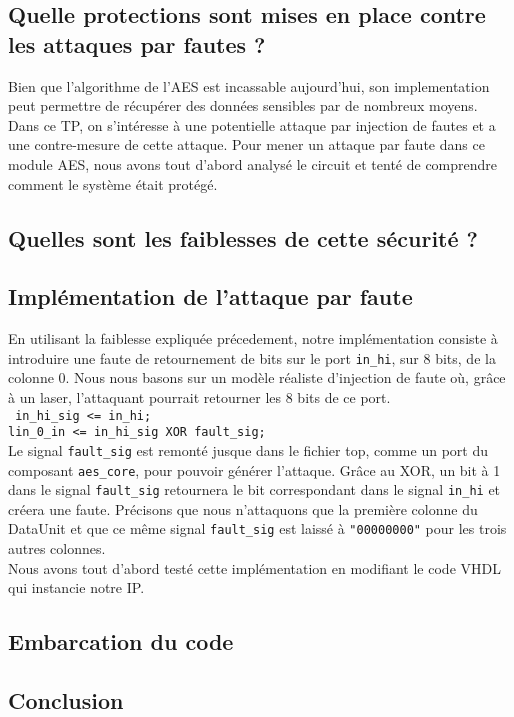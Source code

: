 \subsection{Quelle protections sont mises en place contre les attaques par fautes ?}

Bien que l'algorithme de l'AES est incassable aujourd'hui, son implementation peut permettre de récupérer des données sensibles par de nombreux moyens.
Dans ce TP, on s'intéresse à une potentielle attaque par injection de fautes et a une contre-mesure de cette attaque. 
Pour mener un attaque par faute  dans ce module AES, nous avons tout d'abord analysé le circuit et tenté de comprendre comment le système était protégé.

\subsection{Quelles sont les faiblesses de cette sécurité ?}

\subsection{Implémentation de l'attaque par faute}

En utilisant la faiblesse expliquée précedement, notre implémentation
consiste à introduire une faute de retournement de bits sur le port
\texttt{in_hi}, sur 8 bits, de la colonne 0. Nous nous basons sur un
modèle réaliste d'injection de faute où, grâce à un laser, l'attaquant
pourrait retourner les 8 bits de ce port.\\
\texttt{
  in_hi_sig <= in_hi; \\
  lin_0_in <= in_hi_sig XOR fault_sig;
} \\
Le signal \texttt{fault_sig} est remonté jusque dans le fichier top, comme un
port du composant \texttt{aes_core}, pour pouvoir générer l'attaque.
Grâce au XOR,
un bit à 1 dans le signal \texttt{fault_sig} retournera le bit correspondant
dans le signal \texttt{in_hi} et créera une faute.
Précisons que nous n'attaquons que la première colonne du DataUnit et que ce
même signal \texttt{fault_sig} est laissé à \texttt{"00000000"} pour les trois
autres colonnes. \\
Nous avons tout d'abord testé cette implémentation en modifiant le code
VHDL qui instancie notre IP.



\subsection{Embarcation du code}


\subsection{Conclusion}
